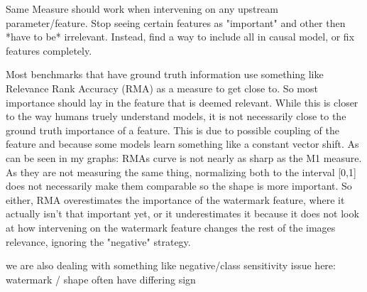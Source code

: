 {Same Measure should work when intervening on any upstream parameter/feature. Stop seeing certain features as "important" and other then *have to be* irrelevant. Instead, find a way to include all in causal model, or fix features completely.

Most benchmarks that have ground truth information use something like Relevance Rank Accuracy (RMA) as a measure to get close to. So most importance should lay in the feature that is deemed relevant. While this is closer to the way humans truely understand models, it is not necessarily close to the ground truth importance of a feature. This is due to possible coupling of the feature and because some models learn something like a constant vector shift. 
As can be seen in my graphs: RMAs curve is not nearly as sharp as the M1 measure. As they are not measuring the same thing, normalizing both to the interval [0,1] does not necessarily make them comparable so the shape is more important. So either, RMA overestimates the importance of the watermark feature, where it actually isn't that important yet, or it underestimates it because it does not look at how intervening on the watermark feature changes the rest of the images relevance, ignoring the "negative" strategy. 

we are also dealing with something like negative/class sensitivity issue here: watermark / shape often have differing sign

}